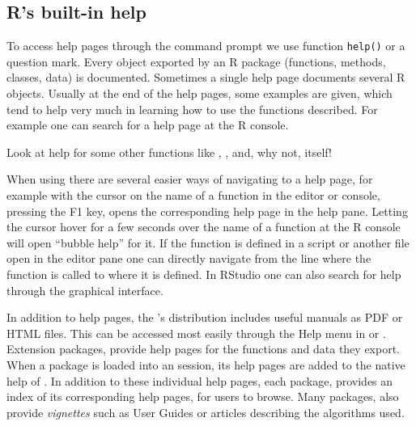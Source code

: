 \documentclass[krantz2,ChapterTOCs]{krantz}\usepackage{knitr}
\begin{document}
\subsection{R's built-in help}

To access help pages through the command prompt we use function \texttt{help()} or a question mark. Every object exported by an R package (functions, methods, classes, data) is documented. Sometimes a single help page documents several R objects. Usually at the end of the help pages, some examples are given, which tend to help very much in learning how to use the functions described. For example one can search for a help page at the R console.

\begin{knitrout}\footnotesize
{}\color{fgcolor}\begin{kframe}
\begin{alltt}
\hlstd{(}\hlstd{)}
\end{alltt}
\end{kframe}
\end{knitrout}

\begin{playground}
Look at help for some other functions like , ,  and, why not,  itself!
\begin{knitrout}\footnotesize
{}\color{fgcolor}\begin{kframe}
\begin{alltt}
\end{alltt}
\end{kframe}
\end{knitrout}
\end{playground}

When using \RStudio there are several easier ways of navigating to a help page, for example with the cursor on the name of a function in the editor or console, pressing the F1 key, opens the corresponding help page in the help pane. Letting the cursor hover for a few seconds over the name of a function at the R console will open ``bubble help'' for it. If the function is defined in a script or another file open in the editor pane one can directly navigate from the line where the function is called to where it is defined. In RStudio one can also search for help through the graphical interface.

In addition to help pages, the 's distribution includes useful manuals as PDF or HTML files. This can be accessed most easily through the Help menu in \RStudio or . Extension packages, provide help pages for the functions and data they export. When a package is loaded into an  session, its help pages are added to the native help of . In addition to these individual help pages, each package, provides an index of its corresponding help pages, for users to browse. Many packages, also provide \emph{vignettes} such as User Guides or articles describing the algorithms used.
\end{document}
